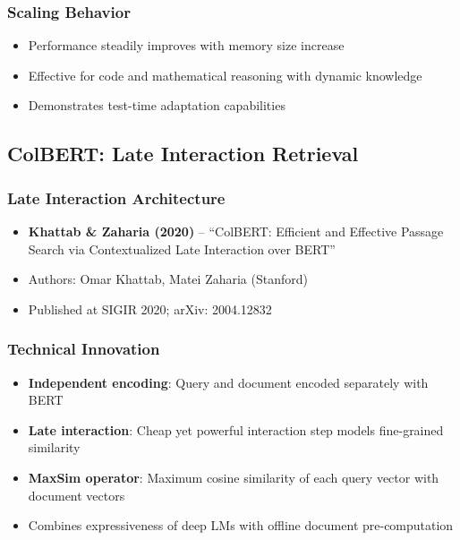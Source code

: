 \documentclass[11pt,letterpaper]{article}
\begin{document}
\subsubsection{Scaling Behavior}
\begin{itemize}[leftmargin=*]
    \item Performance steadily improves with memory size increase
    \item Effective for code and mathematical reasoning with dynamic knowledge
    \item Demonstrates test-time adaptation capabilities
\end{itemize}

\subsection{ColBERT: Late Interaction Retrieval}

\subsubsection{Late Interaction Architecture}
\begin{itemize}[leftmargin=*]
    \item \textbf{Khattab \& Zaharia (2020)} -- ``ColBERT: Efficient and Effective Passage Search via Contextualized Late Interaction over BERT'' \cite{khattab2020colbert}
    \item Authors: Omar Khattab, Matei Zaharia (Stanford)
    \item Published at SIGIR 2020; arXiv: 2004.12832
\end{itemize}

\subsubsection{Technical Innovation}
\begin{itemize}[leftmargin=*]
    \item \textbf{Independent encoding}: Query and document encoded separately with BERT
    \item \textbf{Late interaction}: Cheap yet powerful interaction step models fine-grained similarity
    \item \textbf{MaxSim operator}: Maximum cosine similarity of each query vector with document vectors
    \item Combines expressiveness of deep LMs with offline document pre-computation
\end{itemize}
\end{document}
